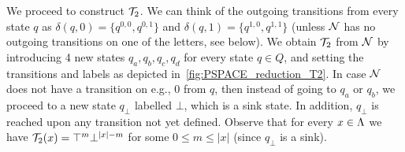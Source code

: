 We proceed to construct $\mathcal{T}_2$. 
We can think of the outgoing transitions from every state $q$ as $\delta(q,0)=\{q^{0,0},q^{0,1}\}$ and $\delta(q,1)=\{q^{1,0},q^{1,1}\}$ (unless $\mathcal{N}$ has no outgoing transitions on one of the letters, see below). We obtain $\mathcal{T}_2$ from $\mathcal{N}$ by introducing 4 new states $q_a,q_b,q_c,q_d$ for every state $q\in Q$, and setting the transitions and labels as depicted in~\autoref{fig:PSPACE_reduction_T2}. In case $\mathcal{N}$ does not have a transition on e.g., $0$ from $q$, then instead of going to $q_a$ or $q_b$, we proceed to a new state $q_\bot$ labelled $\bot$, which is a sink state. In addition, $q_\bot$ is reached upon any transition not yet defined.
Observe that for every $x\in \Lambda$ we have $\mathcal{T}_2(x)=\top^{m}\bot^{|x|-m}$ for some $0\le m\le |x|$ (since $q_\bot$ is a sink).
		
		
